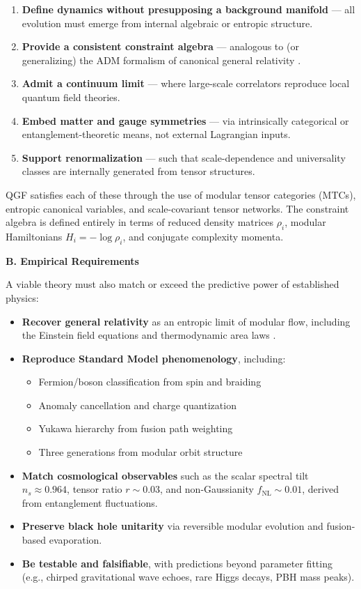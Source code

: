 \documentclass[11pt]{article}
\begin{document}
\begin{enumerate}
  \item \textbf{Define dynamics without presupposing a background manifold} — all evolution must emerge from internal algebraic or entropic structure.
  \item \textbf{Provide a consistent constraint algebra} — analogous to (or generalizing) the ADM formalism of canonical general relativity \cite{Arnowitt2008}.
  \item \textbf{Admit a continuum limit} — where large-scale correlators reproduce local quantum field theories.
  \item \textbf{Embed matter and gauge symmetries} — via intrinsically categorical or entanglement-theoretic means, not external Lagrangian inputs.
  \item \textbf{Support renormalization} — such that scale-dependence and universality classes are internally generated from tensor structures.
\end{enumerate}

QGF satisfies each of these through the use of modular tensor categories (MTCs), entropic canonical variables, and scale-covariant tensor networks. The constraint algebra is defined entirely in terms of reduced density matrices \( \rho_i \), modular Hamiltonians \( H_i = -\log \rho_i \), and conjugate complexity momenta.

\vspace{0.8em}
\noindent\textbf{B. Empirical Requirements}

A viable theory must also match or exceed the predictive power of established physics:

\begin{itemize}
  \item \textbf{Recover general relativity} as an entropic limit of modular flow, including the Einstein field equations and thermodynamic area laws \cite{Jacobson1995}.
  \item \textbf{Reproduce Standard Model phenomenology}, including:
  \begin{itemize}
    \item Fermion/boson classification from spin and braiding
    \item Anomaly cancellation and charge quantization
    \item Yukawa hierarchy from fusion path weighting
    \item Three generations from modular orbit structure
  \end{itemize}
  \item \textbf{Match cosmological observables} such as the scalar spectral tilt \( n_s \approx 0.964 \), tensor ratio \( r \sim 0.03 \), and non-Gaussianity \( f_{\text{NL}} \sim 0.01 \), derived from entanglement fluctuations.
  \item \textbf{Preserve black hole unitarity} via reversible modular evolution and fusion-based evaporation.
  \item \textbf{Be testable and falsifiable}, with predictions beyond parameter fitting (e.g., chirped gravitational wave echoes, rare Higgs decays, PBH mass peaks).
\end{itemize}
\end{document}
